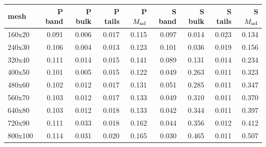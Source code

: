 \setlength{\tabcolsep}{3.5pt}
\begin{tabular}{lrrrrrrrr}
\toprule
mesh & P band & P bulk & P tails & P $M_{\mathrm{nd}}$ & S band & S bulk & S tails & S $M_{\mathrm{nd}}$ \\
\midrule
160x20 & 0.091 & 0.006 & 0.017 & 0.115 & 0.097 & 0.014 & 0.023 & 0.134 \\
240x30 & 0.106 & 0.004 & 0.013 & 0.123 & 0.101 & 0.036 & 0.019 & 0.156 \\
320x40 & 0.111 & 0.014 & 0.015 & 0.141 & 0.089 & 0.131 & 0.014 & 0.234 \\
400x50 & 0.101 & 0.005 & 0.015 & 0.122 & 0.049 & 0.263 & 0.011 & 0.323 \\
480x60 & 0.102 & 0.012 & 0.017 & 0.131 & 0.051 & 0.285 & 0.011 & 0.347 \\
560x70 & 0.103 & 0.012 & 0.017 & 0.133 & 0.049 & 0.310 & 0.011 & 0.370 \\
640x80 & 0.103 & 0.012 & 0.018 & 0.133 & 0.042 & 0.344 & 0.011 & 0.397 \\
720x90 & 0.111 & 0.033 & 0.018 & 0.162 & 0.044 & 0.356 & 0.012 & 0.412 \\
800x100 & 0.114 & 0.031 & 0.020 & 0.165 & 0.030 & 0.465 & 0.011 & 0.507 \\
\bottomrule
\end{tabular}
